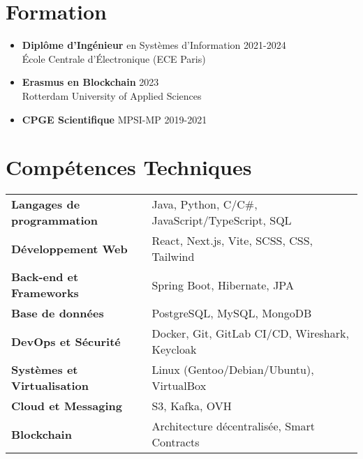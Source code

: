 \documentclass[11pt, a4paper]{article}
\begin{document}
\section*{Formation}
\begin{itemize}
    \item \textbf{Diplôme d'Ingénieur} en Systèmes d'Information \hfill 2021-2024\\
          École Centrale d'Électronique (ECE Paris)

    \item \textbf{Erasmus en Blockchain} \hfill 2023\\
          Rotterdam University of Applied Sciences

    \item \textbf{CPGE Scientifique} MPSI-MP \hfill 2019-2021
\end{itemize}

\section*{Compétences Techniques}

\renewcommand{\arraystretch}{1.3} %
\begin{tabular}{@{}p{5.5cm}p{10cm}@{}}
    \textbf{Langages de programmation} & Java, Python, C/C\#, JavaScript/TypeScript, SQL \vspace{0.4em} \\
    \textbf{Développement Web} & React, Next.js, Vite, SCSS, CSS, Tailwind \vspace{0.4em} \\
    \textbf{Back-end et Frameworks} & Spring Boot, Hibernate, JPA \vspace{0.4em} \\
    \textbf{Base de données} & PostgreSQL, MySQL, MongoDB \vspace{0.4em} \\
    \textbf{DevOps et Sécurité} & Docker, Git, GitLab CI/CD, Wireshark, Keycloak \vspace{0.4em} \\
    \textbf{Systèmes et Virtualisation} & Linux (Gentoo/Debian/Ubuntu), VirtualBox \vspace{0.4em} \\
    \textbf{Cloud et Messaging} & S3, Kafka, OVH \vspace{0.4em} \\
    \textbf{Blockchain} & Architecture décentralisée, Smart Contracts \\
\end{tabular}
\end{document}
